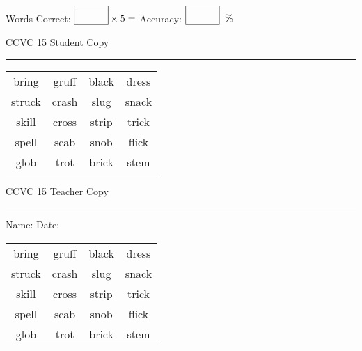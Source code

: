 \documentclass{memoir}
\begin{document}
\normalsize

Words Correct: $\fbox{\phantom{\huge 100}} \times 5 = $ Accuracy: $\fbox{\phantom{\huge 100}}\;\; \%$ 

\vfill

\newpage


\footnotesize \noindent
CCVC 15 \hfill Student Copy
\smallskip
\hrule

\Large

\setlength{\tabcolsep}{14pt}
\def\arraystretch{3}

{\selectfont


\begin{vplace}[0.5]
\begin{center}
\begin{tabular}{cccc}
bring      & gruff & black            & dress \\
struck & crash & slug & snack \\
skill & cross & strip & trick \\
spell & scab & snob & flick            \\
glob & trot & brick       & stem \\
\end{tabular}
\end{center}
\end{vplace}

}

\newpage

\footnotesize \noindent
CCVC 15 \hfill Teacher Copy
\smallskip
\hrule

\normalsize

\vfill

\noindent
Name: \underline{\hspace{1.75in}} \hfill Date: \underline{\hspace{1in}}

\Large

{\selectfont


\begin{vplace}[0.5]
\begin{center}
\begin{tabular}{cccc}
bring      & gruff & black            & dress \\
struck & crash & slug & snack \\
skill & cross & strip & trick \\
spell & scab & snob & flick            \\
glob & trot & brick       & stem \\
\end{tabular}
\end{center}
\end{vplace}



}
\end{document}
